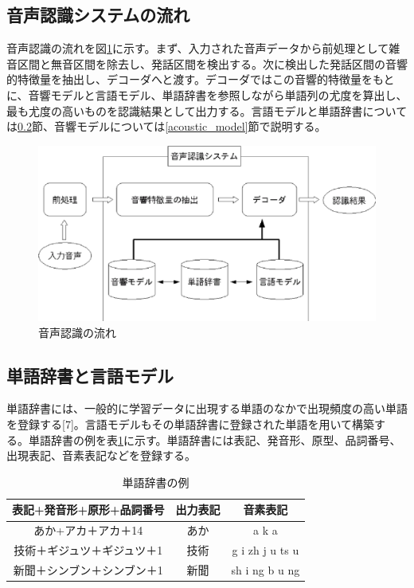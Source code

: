 \subsection{音声認識システムの流れ}
音声認識の流れを図\ref{fig:flow_sp}に示す。まず、入力された音声データから前処理として雑音区間と無音区間を除去し、発話区間を検出する。次に検出した発話区間の音響的特徴量を抽出し、デコーダへと渡す。デコーダではこの音響的特徴量をもとに、音響モデルと言語モデル、単語辞書を参照しながら単語列の尤度を算出し、最も尤度の高いものを認識結果として出力する。言語モデルと単語辞書については\ref{language_model}節、音響モデルについては\ref{acoustic_model}節で説明する。

\begin{figure}[htb]
  \begin{center}
    \includegraphics{../../image/flow_sp.eps}
  \end{center}
  \caption{音声認識の流れ}
  \label{fig:flow_sp}
\end{figure}

\subsection{単語辞書と言語モデル}
\label{language_model}

\par
単語辞書には、一般的に学習データに出現する単語のなかで出現頻度の高い単語を登録する[7]。言語モデルもその単語辞書に登録された単語を用いて構築する。単語辞書の例を表\ref{table:tango}に示す。単語辞書には表記、発音形、原型、品詞番号、出現表記、音素表記などを登録する。\par

\begin{table}[htb]
  \begin{center}
    \caption{単語辞書の例}
    \begin{tabular}{|c||c|c|} \hline
      表記+発音形+原形+品詞番号 & 出力表記 & 音素表記 \\ \hline
      あか+アカ＋アカ＋14 & あか & a k a \\ \hline
      技術＋ギジュツ＋ギジュツ＋1 & 技術 & g i zh j u ts u \\ \hline
      新聞＋シンブン＋シンブン＋1 & 新聞 & sh i ng b u ng \\ \hline
    \end{tabular}
    \label{table:tango}
  \end{center}
\end{table}

